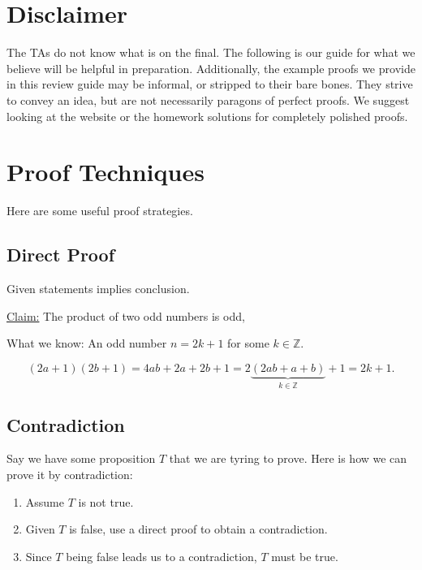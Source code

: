 \documentclass[12pt,letterpaper]{article}
\newcommand{\claim}{\underline{Claim:} }
\newcommand\Z{\mathbb Z}
\begin{document}
\section{Disclaimer}

The TAs do not know what is on the final. The following is our guide for what we believe will be helpful in preparation. Additionally, the example proofs we provide in this review guide may be informal, or stripped to their bare bones. They strive to convey an idea, but are not necessarily paragons of perfect proofs. We suggest looking at the website or the homework solutions for completely polished proofs.


\section{Proof Techniques}

Here are some useful proof strategies.

    \subsection{Direct Proof}
    
    Given statements implies conclusion.
    
    \begin{mdframed}
    \claim The product of two odd numbers is odd,
    
    What we know:
    An odd number $n = 2k + 1$ for some $k \in \Z$.
    
    \[
    (2a+1)(2b+1) = 4ab + 2a + 2b + 1 = 2\underbrace{(2ab + a + b)}_{k \in \Z} + 1 = 2k+1.
    \]
    \end{mdframed}
    
    \subsection{Contradiction}
    
    Say we have some proposition $T$ that we are tyring to prove. Here is how we can  prove it by contradiction:
      \begin{enumerate}
        \item Assume $T$ is not true.
        \item Given $T$ is false, use a direct proof to obtain a contradiction.
        \item Since $T$ being false leads us to a contradiction, $T$ must be true.
      \end{enumerate}
      
\end{document}
